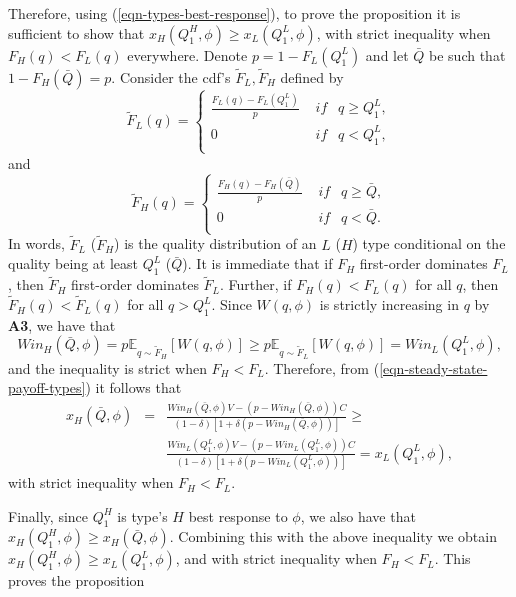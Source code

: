 \documentclass[12pt]{article}
\theoremstyle{plain}
\theoremstyle{definition}
\theoremstyle{remark}
\def\EE{\mathbb{E}}
\begin{document}
    Therefore, using (\ref{eqn-types-best-response}), to prove the proposition it is sufficient to show that $x_H(Q_1^H,\phi)\ge x_L(Q_1^L,\phi)$, with strict inequality when $F_H(q)<F_L(q)$ everywhere. Denote $p=1-F_L(Q_1^L)$ and let $\bar Q$ be such that $1-F_H(\bar Q)=p$. Consider the cdf's $\tilde F_L,\tilde F_H$ defined by 
    $$\tilde F_L(q) = \left\{ \begin{array}{ll}
                        \frac{F_L(q)-F_L(Q_1^L)}{p} & \textit{ if } ~~ q \ge Q_1^L,\\
                        0 & \textit{ if } ~~q < Q_1^L,\\
    \end{array} \right.$$
    and 
    $$\tilde F_H(q) = \left\{ \begin{array}{ll}
                        \frac{F_H(q)-F_H(\bar Q)}{p} & \textit{ if } ~~ q \ge \bar Q,\\
                        0 & \textit{ if } ~~q < \bar Q.\\
    \end{array} \right.$$
    In words, $\tilde F_L$ ($\tilde F_H$) is the quality distribution of an $L$ ($H$) type conditional on the quality being at least $Q_1^L$ ($\bar Q$). It is immediate that if $F_H$ first-order dominates $F_L$, then $\tilde F_H$ first-order dominates $\tilde F_L$. Further, if $F_H(q)<F_L(q)$ for all $q$, then $\tilde F_H(q)<\tilde F_L(q)$ for all $q>Q_1^L$. Since $W(q,\phi)$ is strictly increasing in $q$ by \textbf{A3}, we have that   
    $$Win_H(\bar Q,\phi) = p\EE_{q\sim \tilde F_H}[W(q,\phi)]\ge p\EE_{q\sim \tilde F_L}[W(q,\phi)] = Win_L(Q_1^L,\phi),$$
    and the inequality is strict when $F_H<F_L$. Therefore, from (\ref{eqn-steady-state-payoff-types}) it follows that 
    \begin{eqnarray*}
        x_H(\bar Q,\phi) &=& \frac{Win_H(\bar Q,\phi)V-(p-Win_H(\bar Q,\phi))C}{(1-\delta)[1 + \delta(p-Win_H(\bar Q,\phi))]} \ge \\
                          & &  \frac{Win_L(Q_1^L,\phi)V-(p-Win_L(Q_1^L,\phi))C}{(1-\delta)[1 + \delta(p-Win_L(Q_1^L,\phi))]} = x_L(Q_1^L,\phi),
    \end{eqnarray*}
    with strict inequality when $F_H<F_L$. 

    Finally, since $Q_1^H$ is type's $H$ best response to $\phi$, we also have that $x_H(Q_1^H,\phi) \ge x_H(\bar Q,\phi)$. Combining this with the above inequality we obtain $x_H(Q_1^H,\phi)\ge x_L(Q_1^L,\phi)$, and with strict inequality when $F_H<F_L$. This proves the proposition
\end{document}
